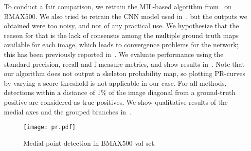 \documentclass[10pt,twocolumn,letterpaper]{article}
\begin{document}
To conduct a fair comparison, we retrain the MIL-based algorithm from~\cite{tsogkas2012learning} on BMAX500.
We also tried to retrain the CNN model used in~\cite{shen2016object}, but the outputs we obtained were too noisy, 
and not of any practical use.
We hypothesize that the reason for that is the lack of consensus among the multiple ground truth maps
available for each image, which leads to convergence problems for the network; this has been previously
reported in~\cite{xie2015holistically}.
We evaluate performance using the standard precision, recall and f-measure metrics, 
and show results in~.
Note that our algorithm does not output a skeleton probability map, so plotting
PR-curves by varying a score threshold is not applicable in our case.
For all methods, detections within a distance of $1\%$ of the image diagonal from a ground-truth positive 
are considered as true positives.
We show qualitative results of the medial axes and the grouped branches in~.

\begin{figure}
\centering
\texttt{[image: pr.pdf]}
\caption{Medial point detection in BMAX500 val set.}
\label{fig:experiments:detection:pr}
\end{figure}
\end{document}
